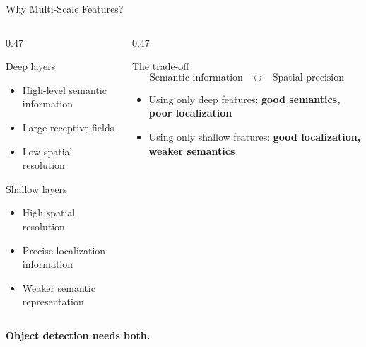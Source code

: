 \documentclass[aspectratio=169,11pt]{beamer}
\begin{document}

\begin{frame}{Why Multi-Scale Features?}

\begin{columns}[t]

\begin{column}{0.47\textwidth}

\begin{block}{Deep layers}
\begin{itemize}
    \item High-level semantic information
    \item Large receptive fields
    \item Low spatial resolution
\end{itemize}
\end{block}

\vspace{0.2cm}

\begin{block}{Shallow layers}
\begin{itemize}
    \item High spatial resolution
    \item Precise localization information
    \item Weaker semantic representation
\end{itemize}
\end{block}

\end{column}

\begin{column}{0.47\textwidth}

\begin{block}{The trade-off}
\centering
\[
\text{Semantic information}
\quad \leftrightarrow \quad
\text{Spatial precision}
\]
\end{block}

\vspace{0.3cm}

\begin{itemize}
    \item Using only deep features:
    \textbf{good semantics, poor localization}
    
    \item Using only shallow features:
    \textbf{good localization, weaker semantics}
\end{itemize}

\end{column}

\end{columns}

\vspace{0.3cm}

\centering
\textbf{Object detection needs both.}

\end{frame}
\end{document}
